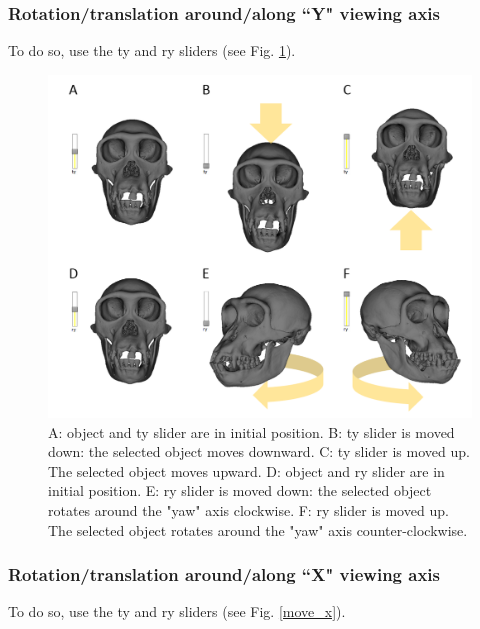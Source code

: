 \subsubsection{Rotation/translation around/along ``Y" viewing axis}

To do so, use the ty and ry sliders (see Fig. \ref{move_y}).

\begin{figure}
  \centering
  \includegraphics[scale=0.45]{images/06/objects/move_objects_y.png} 
	\caption{A: object and ty slider are in initial position. B: ty slider is moved down: the selected object moves downward. C: ty slider is moved up. The selected object moves upward. D: object and ry slider are in initial position. E: ry slider is moved down: the selected object rotates around the "yaw" axis clockwise. F: ry slider is moved up. The selected object rotates around the "yaw" axis counter-clockwise.}
\label{move_y}
 
\end{figure}



\subsubsection{Rotation/translation around/along ``X" viewing axis}

To do so, use the ty and ry sliders (see Fig. \ref{move_x}).

